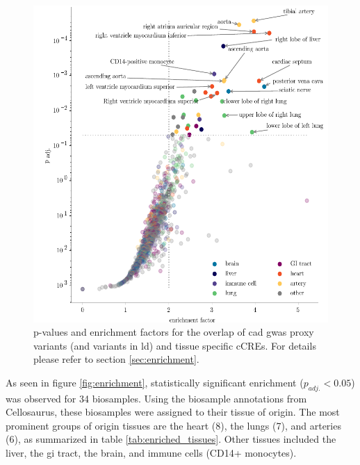 \begin{figure}[h!]
\capstart
    \centering
	\includegraphics{Abbildung/enrichment_scatter.pdf}

	\begin{minipage}{\captionwidth}
		\caption[enrichemtn]{ \newline p-values and enrichment factors for the overlap of \ac{cad} \ac{gwas} proxy variants (and variants in \ac{ld}) and tissue specific \acp{cCRE}. For details please refer to section \ref{sec:enrichment}.}
		\label{fig:enrichment_scatter}
	\end{minipage}
\end{figure}

As seen in figure \ref{fig:enrichment}, statistically significant enrichment ($p_{adj.}<0.05$) was observed for 34 biosamples. Using the biosample annotations from Cellosaurus, these biosamples were assigned to their tissue of origin. The most prominent groups of origin tissues are the heart (8), the lungs (7), and arteries (6), as summarized in table \ref{tab:enriched_tissues}. Other tissues included the liver, the \ac{gi} tract, the brain, and immune cells (CD14+ monocytes).


